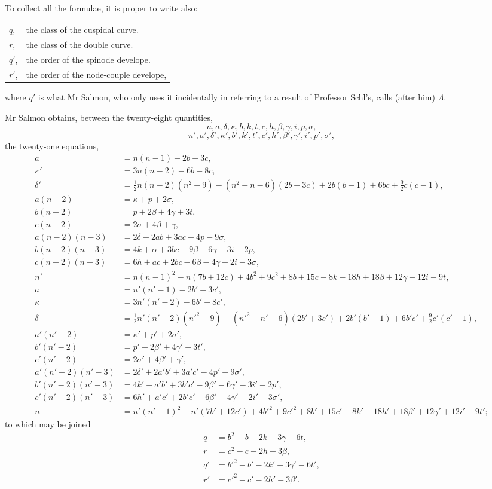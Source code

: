 \documentclass[11pt,a4paper]{book}
\begin{document}
To collect all the formulae, it is proper to write also:

\begin{tabular}{@{}ll@{}}
$q$, & the class of the cuspidal curve. \\
$r$, & the class of the double curve. \\
$q'$, & the order of the spinode develope. \\
$r'$, & the order of the node-couple develope, \\
\end{tabular}

where $q'$ is what Mr Salmon, who only uses it incidentally in referring to a result of Professor Schl\afli's, calls (after him) $\Lambda$.

Mr Salmon obtains, between the twenty-eight quantities,
\[
n,a,\delta,\kappa,b,k,t,c,h,\beta,\gamma,i,p,\sigma,
\]
\[
n',a',\delta',\kappa',b',k',t',c',h',\beta',\gamma',i',p',\sigma',
\]
the twenty-one equations,
\begin{align}
a &= n(n-1)-2b-3c,\\
\kappa' &= 3n(n-2)-6b-8c,\\
\delta' &= \tfrac{1}{2}n(n-2)(n^2-9)-(n^2-n-6)(2b+3c)+2b(b-1)+6bc+\tfrac{9}{2}c(c-1),\\
a(n-2) &= \kappa+p+2\sigma,\\
b(n-2) &= p+2\beta+4\gamma+3t,\\
c(n-2) &= 2\sigma+4\beta+\gamma,\\
a(n-2)(n-3) &= 2\delta+2ab+3ac-4p-9\sigma,\\
b(n-2)(n-3) &= 4k+\alpha+3bc-9\beta-6\gamma-3i-2p,\\
c(n-2)(n-3) &= 6h+ac+2bc-6\beta-4\gamma-2i-3\sigma,\\
n' &= n(n-1)^2-n(7b+12c)+4b^2+9c^2+8b+15c-8k-18h+18\beta+12\gamma+12i-9t,\tag{*}\\
a &= n'(n'-1)-2b'-3c',\\
\kappa &= 3n'(n'-2)-6b'-8c',\\
\delta &= \tfrac{1}{2}n'(n'-2)(n'^2-9)-(n'^2-n'-6)(2b'+3c')+2b'(b'-1)+6b'c'+\tfrac{9}{2}c'(c'-1),\\
a'(n'-2) &= \kappa'+p'+2\sigma',\\
b'(n'-2) &= p'+2\beta'+4\gamma'+3t',\\
c'(n'-2) &= 2\sigma'+4\beta'+\gamma',\\
a'(n'-2)(n'-3) &= 2\delta'+2a'b'+3a'c'-4p'-9\sigma',\\
b'(n'-2)(n'-3) &= 4k'+a'b'+3b'c'-9\beta'-6\gamma'-3i'-2p',\\
c'(n'-2)(n'-3) &= 6h'+a'c'+2b'c'-6\beta'-4\gamma'-2i'-3\sigma',\\
n &= n'(n'-1)^2-n'(7b'+12c')+4b'^2+9c'^2+8b'+15c'-8k'-18h'+18\beta'+12\gamma'+12i'-9t';\tag{*}
\end{align}
to which may be joined
\begin{align}
q &= b^2-b-2k-3\gamma-6t,\\
r &= c^2-c-2h-3\beta,\\
q' &= b'^2-b'-2k'-3\gamma'-6t',\\
r' &= c'^2-c'-2h'-3\beta'.
\end{align}
\end{document}

